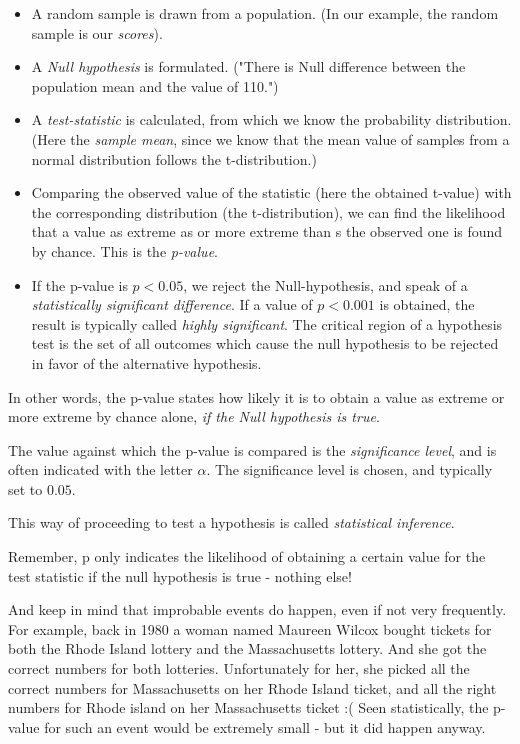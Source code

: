 \begin{itemize}
  \item A random sample is drawn from a population. (In our example, the random sample is our \emph{scores}).
  \item A \emph{Null hypothesis} is formulated. ("There is Null difference between the population mean and the value of 110.")
  \item A \emph{test-statistic} is calculated, from which we know the probability distribution. (Here the \emph{sample mean}, since we know that the mean value of samples from a normal distribution follows the t-distribution.)
  \item Comparing the observed value of the statistic (here the obtained t-value) with the corresponding distribution (the t-distribution), we can find the likelihood that a value as extreme as or more extreme than s the observed one is found by chance. This is the \emph{p-value}.
  \item If the p-value is $p<0.05$, we reject the Null-hypothesis, and speak of a \emph{statistically significant difference}. If a value of $p<0.001$ is obtained, the result is typically called \emph{highly significant}. The critical region of a hypothesis test is the set of all outcomes which cause the null hypothesis to be rejected in favor of the alternative hypothesis.
\end{itemize}

In other words, the p-value states how likely it is to obtain a value as extreme or more extreme by chance alone, \emph{if the Null hypothesis is true}.

The value against which the p-value is compared is the \emph{significance level}, and is often indicated with the letter $\alpha$. The significance level is chosen, and typically set to $0.05$.

This way of proceeding to test a hypothesis is called \emph{statistical inference}.

Remember, p only indicates the likelihood of obtaining a certain value for the test statistic if the null hypothesis is true - nothing else!

And keep in mind that improbable events do happen, even if not very frequently. For example, back in 1980 a woman named Maureen Wilcox bought tickets for both the Rhode Island lottery and the Massachusetts lottery. And she got the correct numbers for both lotteries. Unfortunately for her, she picked all the correct numbers for Massachusetts on her Rhode Island ticket, and all the  right numbers for Rhode island on her Massachusetts ticket :(  Seen statistically, the p-value for such an event would be extremely small - but it did happen anyway.

